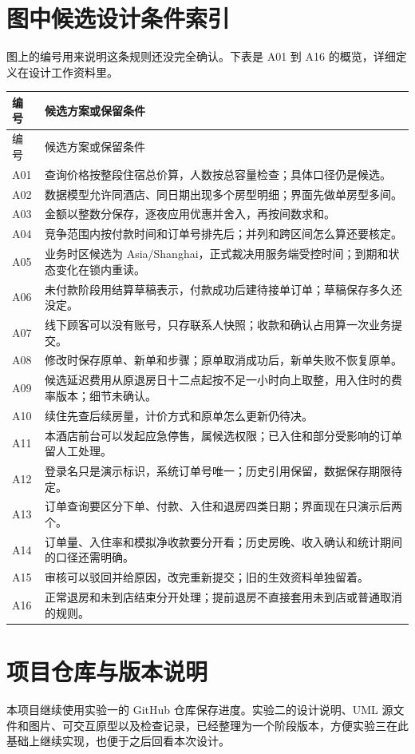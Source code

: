 \documentclass[UTF8,a4paper,zihao=-4,fontset=none]{ctexart}
\begin{document}
\section{图中候选设计条件索引}
图上的编号用来说明这条规则还没完全确认。下表是 A01 到 A16 的概览，详细定义在设计工作资料里。
\small
\begin{longtable}{p{12mm}p{143mm}}
\toprule 编号&候选方案或保留条件\\\midrule\endfirsthead
\toprule 编号&候选方案或保留条件\\\midrule\endhead
A01&查询价格按整段住宿总价算，人数按总容量检查；具体口径仍是候选。\\
A02&数据模型允许同酒店、同日期出现多个房型明细；界面先做单房型多间。\\
A03&金额以整数分保存，逐夜应用优惠并舍入，再按间数求和。\\
A04&竞争范围内按付款时间和订单号排先后；并列和跨区间怎么算还要核定。\\
A05&业务时区候选为 Asia/Shanghai，正式裁决用服务端受控时间；到期和状态变化在锁内重读。\\
A06&未付款阶段用结算草稿表示，付款成功后建待接单订单；草稿保存多久还没定。\\
A07&线下顾客可以没有账号，只存联系人快照；收款和确认占用算一次业务提交。\\
A08&修改时保存原单、新单和步骤；原单取消成功后，新单失败不恢复原单。\\
A09&候选延迟费用从原退房日十二点起按不足一小时向上取整，用入住时的费率版本；细节未确认。\\
A10&续住先查后续房量，计价方式和原单怎么更新仍待决。\\
A11&本酒店前台可以发起应急停售，属候选权限；已入住和部分受影响的订单留人工处理。\\
A12&登录名只是演示标识，系统订单号唯一；历史引用保留，数据保存期限待定。\\
A13&订单查询要区分下单、付款、入住和退房四类日期；界面现在只演示后两个。\\
A14&订单量、入住率和模拟净收款要分开看；历史房晚、收入确认和统计期间的口径还需明确。\\
A15&审核可以驳回并给原因，改完重新提交；旧的生效资料单独留着。\\
A16&正常退房和未到店结束分开处理；提前退房不直接套用未到店或普通取消的规则。\\\bottomrule
\end{longtable}
\normalsize

\clearpage
\section{项目仓库与版本说明}
本项目继续使用实验一的 GitHub 仓库保存进度。实验二的设计说明、UML 源文件和图片、可交互原型以及检查记录，已经整理为一个阶段版本，方便实验三在此基础上继续实现，也便于之后回看本次设计。
\end{document}
